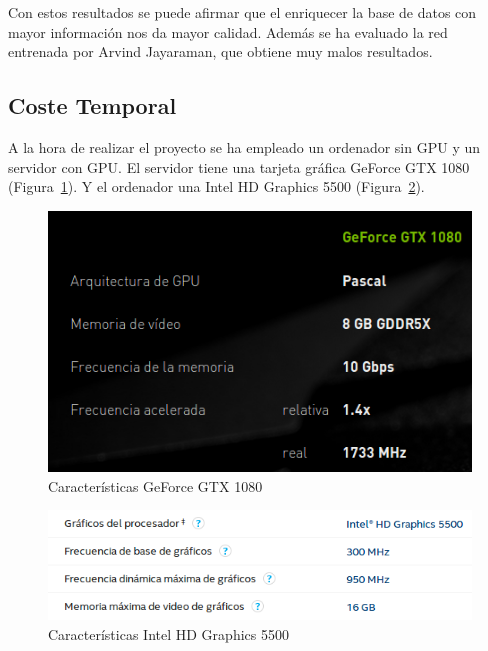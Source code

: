 Con estos resultados se puede afirmar que el enriquecer la base de datos con mayor información nos da mayor calidad. Además se ha evaluado la red entrenada por Arvind Jayaraman, que obtiene muy malos resultados.

\subsection{Coste Temporal}

A la hora de realizar el proyecto se ha empleado un ordenador sin GPU y un servidor con GPU. El servidor tiene una tarjeta gráfica GeForce GTX 1080 (Figura~\ref{fig.nvidia}). Y el ordenador una Intel HD Graphics 5500 (Figura~\ref{fig.intel}).

\begin{figure}[H] 
\begin{center}
	\includegraphics[scale=0.6]{figures/Experimentos/nvidia.png}
   \caption{Características GeForce GTX 1080}
	\label{fig.nvidia}
\end{center}
\end{figure}

\begin{figure}[H] 
\begin{center}
	\includegraphics[scale=0.7]{figures/Experimentos/intel.png}
   \caption{Características Intel HD Graphics 5500}
	\label{fig.intel}
\end{center}
\end{figure}

